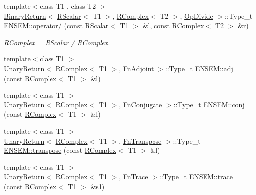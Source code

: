 \begin{DoxyCompactItemize}
{\footnotesize template$<$class T1 , class T2 $>$ }\\\mbox{\hyperlink{structENSEM_1_1BinaryReturn}{Binary\+Return}}$<$ \mbox{\hyperlink{classENSEM_1_1RScalar}{R\+Scalar}}$<$ T1 $>$, \mbox{\hyperlink{classENSEM_1_1RComplex}{R\+Complex}}$<$ T2 $>$, \mbox{\hyperlink{structENSEM_1_1OpDivide}{Op\+Divide}} $>$\+::Type\+\_\+t \mbox{\hyperlink{group__rcomplex_gacaba74ac4d092284f9b979ce552b8beb}{E\+N\+S\+E\+M\+::operator/}} (const \mbox{\hyperlink{classENSEM_1_1RScalar}{R\+Scalar}}$<$ T1 $>$ \&l, const \mbox{\hyperlink{classENSEM_1_1RComplex}{R\+Complex}}$<$ T2 $>$ \&r)
\begin{DoxyCompactList}\small\item\em \mbox{\hyperlink{classENSEM_1_1RComplex}{R\+Complex}} = \mbox{\hyperlink{classENSEM_1_1RScalar}{R\+Scalar}} / \mbox{\hyperlink{classENSEM_1_1RComplex}{R\+Complex}}. \end{DoxyCompactList}\item 
{\footnotesize template$<$class T1 $>$ }\\\mbox{\hyperlink{structENSEM_1_1UnaryReturn}{Unary\+Return}}$<$ \mbox{\hyperlink{classENSEM_1_1RComplex}{R\+Complex}}$<$ T1 $>$, \mbox{\hyperlink{structENSEM_1_1FnAdjoint}{Fn\+Adjoint}} $>$\+::Type\+\_\+t \mbox{\hyperlink{group__rcomplex_ga4cb16a1d0f8f130aeb4daf0967a43c7e}{E\+N\+S\+E\+M\+::adj}} (const \mbox{\hyperlink{classENSEM_1_1RComplex}{R\+Complex}}$<$ T1 $>$ \&l)
\item 
{\footnotesize template$<$class T1 $>$ }\\\mbox{\hyperlink{structENSEM_1_1UnaryReturn}{Unary\+Return}}$<$ \mbox{\hyperlink{classENSEM_1_1RComplex}{R\+Complex}}$<$ T1 $>$, \mbox{\hyperlink{structENSEM_1_1FnConjugate}{Fn\+Conjugate}} $>$\+::Type\+\_\+t \mbox{\hyperlink{group__rcomplex_gaa21f7147b1663d93c675ea24647c9158}{E\+N\+S\+E\+M\+::conj}} (const \mbox{\hyperlink{classENSEM_1_1RComplex}{R\+Complex}}$<$ T1 $>$ \&l)
\item 
{\footnotesize template$<$class T1 $>$ }\\\mbox{\hyperlink{structENSEM_1_1UnaryReturn}{Unary\+Return}}$<$ \mbox{\hyperlink{classENSEM_1_1RComplex}{R\+Complex}}$<$ T1 $>$, \mbox{\hyperlink{structENSEM_1_1FnTranspose}{Fn\+Transpose}} $>$\+::Type\+\_\+t \mbox{\hyperlink{group__rcomplex_gaadd686b6457e8156edd6c65c475e4eb5}{E\+N\+S\+E\+M\+::transpose}} (const \mbox{\hyperlink{classENSEM_1_1RComplex}{R\+Complex}}$<$ T1 $>$ \&l)
\item 
{\footnotesize template$<$class T1 $>$ }\\\mbox{\hyperlink{structENSEM_1_1UnaryReturn}{Unary\+Return}}$<$ \mbox{\hyperlink{classENSEM_1_1RComplex}{R\+Complex}}$<$ T1 $>$, \mbox{\hyperlink{structENSEM_1_1FnTrace}{Fn\+Trace}} $>$\+::Type\+\_\+t \mbox{\hyperlink{group__rcomplex_ga9f6f9e69dbfccacb954b9fd9947ca592}{E\+N\+S\+E\+M\+::trace}} (const \mbox{\hyperlink{classENSEM_1_1RComplex}{R\+Complex}}$<$ T1 $>$ \&s1)

\end{DoxyCompactItemize}
